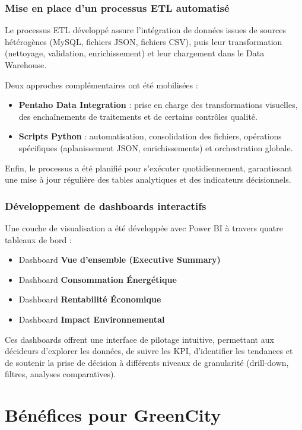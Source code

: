 \documentclass[12pt,a4paper]{report}
\begin{document}
\subsubsection{Mise en place d’un processus ETL automatisé}

Le processus ETL développé assure l’intégration de données issues de sources hétérogènes (MySQL, fichiers JSON, fichiers CSV), puis leur transformation (nettoyage, validation, enrichissement) et leur chargement dans le Data Warehouse.

Deux approches complémentaires ont été mobilisées :
\begin{itemize}
    \item \textbf{Pentaho Data Integration} : prise en charge des transformations visuelles, des enchaînements de traitements et de certains contrôles qualité.
    \item \textbf{Scripts Python} : automatisation, consolidation des fichiers, opérations spécifiques (aplanissement JSON, enrichissements) et orchestration globale.
\end{itemize}

Enfin, le processus a été planifié pour s’exécuter quotidiennement, garantissant une mise à jour régulière des tables analytiques et des indicateurs décisionnels.

\subsubsection{Développement de dashboards interactifs}

Une couche de visualisation a été développée avec Power BI à travers quatre tableaux de bord :

\begin{itemize}
    \item Dashboard \textbf{Vue d’ensemble (Executive Summary)}
    \item Dashboard \textbf{Consommation Énergétique}
    \item Dashboard \textbf{Rentabilité Économique}
    \item Dashboard \textbf{Impact Environnemental}
\end{itemize}

Ces dashboards offrent une interface de pilotage intuitive, permettant aux décideurs d’explorer les données, de suivre les KPI, d’identifier les tendances et de soutenir la prise de décision à différents niveaux de granularité (drill-down, filtres, analyses comparatives).

\section{Bénéfices pour GreenCity}
\end{document}
